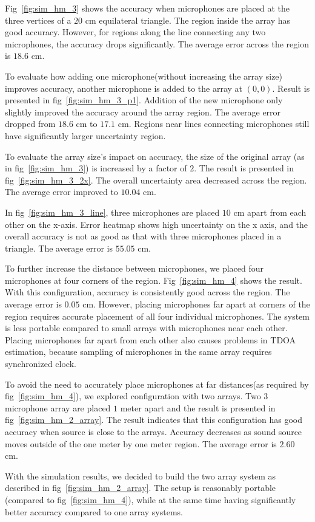 Fig~\ref{fig:sim_hm_3} shows the accuracy when microphones are placed at the three vertices of a $20$ cm equilateral triangle. The region inside the array has good accuracy. However, for regions along the line connecting any two microphones, the accuracy drops significantly. The average error across the region is $18.6$ cm.

To evaluate how adding one microphone(without increasing the array size) improves accuracy, another microphone is added to the array at $(0,0)$. Result is presented in fig~\ref{fig:sim_hm_3_p1}. Addition of the new microphone only slightly improved the accuracy around the array region. The average error dropped from $18.6$ cm to $17.1$ cm. Regions near lines connecting microphones still have significantly larger uncertainty region.

To evaluate the array size's impact on accuracy, the size of the original array (as in fig~\ref{fig:sim_hm_3}) is increased by a factor of $2$. The result is presented in fig~\ref{fig:sim_hm_3_2x}. The overall uncertainty area decreased across the region. The average error improved to $10.04$ cm. 

In fig~\ref{fig:sim_hm_3_line}, three microphones are placed $10$ cm apart from each other on the x-axis. Error heatmap shows high uncertainty on the x axis, and the overall accuracy is not as good as that with three microphones placed in a triangle. The average error is $55.05$ cm. 

To further increase the distance between microphones, we placed four microphones at four corners of the region. Fig~\ref{fig:sim_hm_4} shows the result. With this configuration, accuracy is consistently good across the region. The average error is $0.05$ cm.  However, placing microphones far apart at corners of the region requires accurate placement of all four individual microphones. The system is less portable compared to small arrays with microphones near each other. Placing microphones far apart from each other also causes problems in TDOA estimation, because sampling of microphones in the same array requires synchronized clock.

To avoid the need to accurately place microphones at far distances(as required by fig~\ref{fig:sim_hm_4}), we explored configuration with two arrays. Two $3$ microphone array are placed $1$ meter apart and the result is presented in fig~\ref{fig:sim_hm_2_array}.  The result indicates that this configuration has good accuracy when source is close to the arrays. Accuracy decreases as sound source moves outside of the one meter by one meter region. The average error is $2.60$ cm. 

With the simulation results, we decided to build the two array system as described in fig~\ref{fig:sim_hm_2_array}. The setup is reasonably portable (compared to fig~\ref{fig:sim_hm_4}), while at the same time having significantly better accuracy compared to one array systems.
